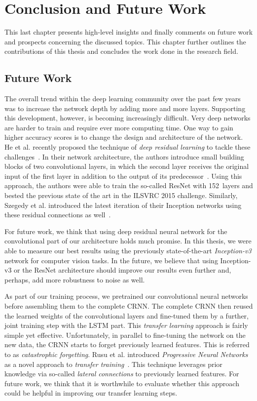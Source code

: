 \section{Conclusion and Future Work}
\label{sec:summary}
This last chapter presents high-level insights and finally comments on
future work and prospects concerning the discussed topics.
This chapter further outlines the contributions of this thesis and concludes the work done
in the research field.

\subsection{Future Work}
The overall trend within the deep learning community over the past few years was to increase the network depth by adding more and more layers. Supporting this development, however, is becoming increasingly difficult. Very deep networks are harder to train and require ever more computing time. One way to gain higher accuracy scores is to change the design and architecture of the network. He et al. recently proposed the technique of \emph{deep residual learning} to tackle these challenges~\cite{he2016deep}. In their network architecture, the authors introduce small building blocks of two convolutional layers, in which the second layer receives the original input of the first layer in addition to the output of its predecessor~\cite{he2016deep}. Using this approach, the authors were able to train the so-called ResNet with \num{152}~layers and bested the previous state of the art in the ILSVRC 2015 challenge. Similarly, Szegedy et al. introduced the latest iteration of their Inception networks using these residual connections as well~\cite{szegedy2016inception}.

For future work, we think that using deep residual neural network for the convolutional part of our architecture holds much promise. In this thesis, we were able to measure our best results using the previously state-of-the-art \emph{Inception-v3} network for computer vision tasks. In the future, we believe that using Inception-v3 or the ResNet architecture should improve our results even further and, perhaps, add more robustness to noise as well.

As part of our training process, we pretrained our convolutional neural networks before assembling them to the complete CRNN. The complete CRNN then reused the learned weights of the convolutional layers and fine-tuned them by a further, joint training step with the LSTM part. This \emph{transfer learning} approach is fairly simple yet effective. Unfortunately, in parallel to fine-tuning the network on the new data, the CRNN starts to forget previously learned features. This is referred to as \emph{catastrophic forgetting}. Rusu et al. introduced \emph{Progressive Neural Networks} as a novel approach to \emph{transfer training}~\cite{rusu2016progressive}. This technique leverages prior knowledge via so-called \emph{lateral connections} to previously learned features. For future work, we think that it is worthwhile to evaluate whether this approach could be helpful in improving our transfer learning steps.

